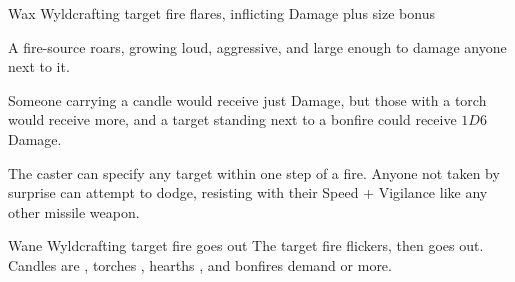   {\mFire}%
  {Wax}%
  {}%
  {Wyldcrafting}%
  {target fire flares, inflicting  Damage plus size bonus}%
  {
    A fire-source roars, growing loud, aggressive, and large enough to damage anyone next to it.

    Someone carrying a candle would receive just  Damage, but those with a torch would receive more, and a target standing next to a bonfire could receive $1D6$ Damage.

    The caster can specify any target within one step of a fire.
    Anyone not taken by surprise can attempt to dodge, resisting with their Speed + Vigilance like any other missile weapon.
  }

  {\mFire}%
  {Wane}%
  {}%
  {Wyldcrafting}%
  {target fire goes out}%
  {
    The target fire flickers, then goes out.
    Candles are , torches , hearths , and bonfires demand  or more.
  }
